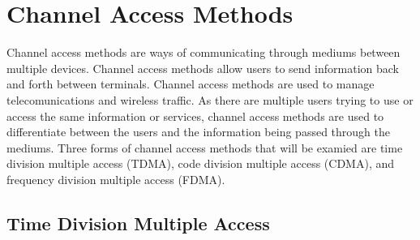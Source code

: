 \documentclass[12pt]{report}
\begin{document}
\section{Channel Access Methods}

Channel access methods are ways of communicating through mediums between multiple devices. Channel access methods allow users to send information back and forth between terminals. Channel access methods are used to manage telecomunications and wireless traffic. As there are multiple users trying to use or access the same information or services, channel access methods are used to differentiate between the users and the information being passed through the mediums. Three forms of channel access methods that will be examied are time division multiple access (TDMA), code division multiple access (CDMA), and frequency division multiple access (FDMA). 

\subsection{Time Division Multiple Access}
\end{document}
